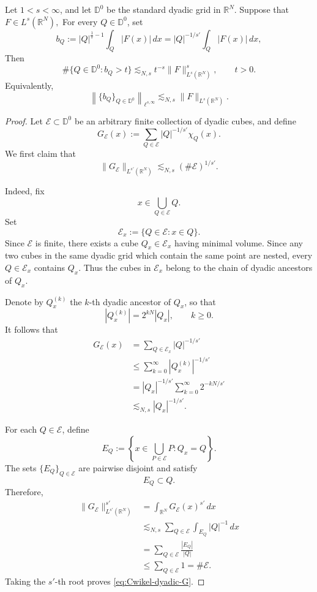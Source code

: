 \documentclass[12pt]{amsart}
\begin{document}
\begin{lemma}\label{lem:Cwikel-dyadic-distribution}
Let $1<s<\infty$, and let $\mathbb D^0$ be the standard dyadic grid
in $\mathbb R^N$. Suppose that
$
F\in L^s(\mathbb R^N),
$
For every $Q\in\mathbb D^0$, set
\[
b_Q
:=
|Q|^{\frac1s-1}\int_Q |F(x)|\,dx
=
|Q|^{-1/s'}\int_Q |F(x)|\,dx,
\]
Then
\begin{equation}\label{eq:Cwikel-dyadic-distribution}
\#\bigl\{Q\in\mathbb D^0:b_Q>t\bigr\}
\lesssim_{N,s}
t^{-s}\|F\|_{L^s(\mathbb R^N)}^s,
\qquad t>0.
\end{equation}
Equivalently,
\[
\left\|\{b_Q\}_{Q\in\mathbb D^0}\right\|_{\ell^{s,\infty}}
\lesssim_{N,s}
\|F\|_{L^s(\mathbb R^N)}.
\]
\end{lemma}

\begin{proof}
Let $\mathcal E\subset\mathbb D^0$ be an arbitrary finite collection
of dyadic cubes, and define
\[
G_{\mathcal E}(x)
:=
\sum_{Q\in\mathcal E}
|Q|^{-1/s'}\chi_Q(x).
\]
We first claim that
\begin{equation}\label{eq:Cwikel-dyadic-G}
\|G_{\mathcal E}\|_{L^{s'}(\mathbb R^N)}
\lesssim_{N,s}
(\#\mathcal E)^{1/s'}.
\end{equation}

Indeed, fix
\[
x\in\bigcup_{Q\in\mathcal E}Q.
\]
Set
\[
\mathcal E_x
:=
\{Q\in\mathcal E:x\in Q\}.
\]
Since $\mathcal E$ is finite, there exists a cube
$Q_x\in\mathcal E_x$ having minimal volume. Since any two cubes in
the same dyadic grid which contain the same point are nested, every
$Q\in\mathcal E_x$ contains $Q_x$. Thus the cubes in
$\mathcal E_x$ belong to the chain of dyadic ancestors of $Q_x$.

Denote by $Q_x^{(k)}$ the $k$-th dyadic ancestor of $Q_x$, so that
\[
|Q_x^{(k)}|
=
2^{kN}|Q_x|,
\qquad k\geq0.
\]
It follows that
\begin{align*}
G_{\mathcal E}(x)
&=
\sum_{Q\in\mathcal E_x}|Q|^{-1/s'}
\\
&\leq
\sum_{k=0}^{\infty}
|Q_x^{(k)}|^{-1/s'}
\\
&=
|Q_x|^{-1/s'}
\sum_{k=0}^{\infty}
2^{-kN/s'}
\\
&\lesssim_{N,s}
|Q_x|^{-1/s'}.
\end{align*}

For each $Q\in\mathcal E$, define
\[
E_Q
:=
\left\{
x\in\bigcup_{P\in\mathcal E}P:
Q_x=Q
\right\}.
\]
The sets $\{E_Q\}_{Q\in\mathcal E}$ are pairwise disjoint and
satisfy
\[
E_Q\subset Q.
\]
Therefore,
\begin{align*}
\|G_{\mathcal E}\|_{L^{s'}(\mathbb R^N)}^{s'}
&=
\int_{\mathbb R^N}
G_{\mathcal E}(x)^{s'}\,dx
\\
&\lesssim_{N,s}
\sum_{Q\in\mathcal E}
\int_{E_Q}|Q|^{-1}\,dx
\\
&=
\sum_{Q\in\mathcal E}
\frac{|E_Q|}{|Q|}
\\
&\leq
\sum_{Q\in\mathcal E}1
=
\#\mathcal E.
\end{align*}
Taking the $s'$-th root proves
\eqref{eq:Cwikel-dyadic-G}.


\end{proof}
\end{document}
